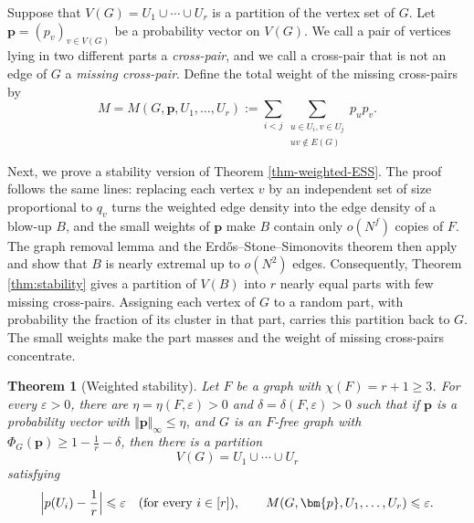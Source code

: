 \documentclass[11pt, a4paper]{article}
\newtheorem{theorem}{Theorem}[section]
\theoremstyle{definition}
\theoremstyle{plain}
\renewcommand{\le}{\leqslant}
\renewcommand{\ge}{\geqslant}
\begin{document}
Suppose that $V(G)=U_1\cup\cdots\cup U_r$ is a
partition of the vertex set of $G$. Let $\bm{p}=(p_v)_{v\in V(G)}$ be a  probability vector on $V(G)$. 
We call a pair of vertices lying in two different parts a \emph{cross-pair}, and we call a cross-pair that is not an edge of $G$ a \emph{missing cross-pair}. 
Define the total weight of the missing cross-pairs by
\begin{equation}\label{eq:M-definition}
  M=M(G,\bm{p},U_1,\ldots,U_r)
  :=\sum_{ i<j }
    \sum_{\substack{u\in U_i, v\in U_j\\uv\notin E(G)}}p_up_v.
\end{equation}


Next, we prove a stability version of Theorem \ref{thm-weighted-ESS}. The proof follows the same lines:  replacing each
vertex $v$ by an independent set of size proportional to
$q_v$ turns the weighted edge density into the 
edge density of a blow-up $B$, and the small
weights of $\bm{p}$ make $B$ contain only  $o(N^f)$ copies of $F$.  
The graph removal lemma and the
Erd\H{o}s--Stone--Simonovits theorem then apply and show that $B$ 
is nearly extremal up to $o(N^2)$ edges. Consequently, Theorem
\ref{thm:stability} gives a partition of $V(B)$
into $r$ nearly equal parts with few missing
cross-pairs. Assigning each vertex of $G$ to a
random part, with probability the fraction of its
cluster in that part, carries this partition back to
$G$. The small weights make the part masses
and the weight of missing cross-pairs concentrate.

\begin{theorem}[Weighted stability]
\label{thm:weighted-stability}
Let $F$ be a graph with $\chi (F)=r+1\ge 3$. For every
$\varepsilon >0$, there are $\eta =\eta (F,\varepsilon )>0$ and $\delta =\delta(F,\varepsilon)>0$ such that
if $\bm{p}$ is a probability vector with
$\Vert \bm{p} \Vert_\infty\le \eta$, 
and $G$ is an $F$-free graph with $\Phi_G(\bm{p})\ge 1- \frac{1}{r} - \delta$, then there is a
  partition 
  $$V(G)=U_1\cup \cdots \cup U_r$$
   satisfying 
  \[
    \Bigl|p(U_i)-\frac1r\Bigr|\le \varepsilon 
    \quad (\text{for every}~i\in [r]),
    \qquad
    M(G,\bm{p},U_1,\ldots ,U_r)\le \varepsilon .
  \] 
\end{theorem}
\end{document}
